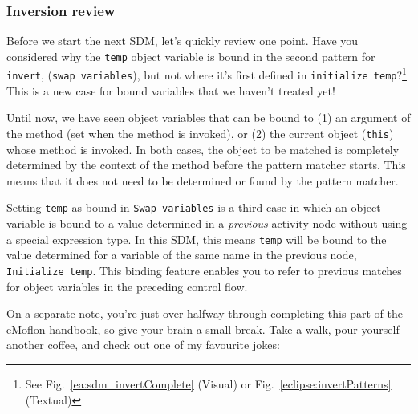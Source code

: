 \newpage
\subsubsection{Inversion review}
\genHeader
\hypertarget{invert close}{}

Before we start the next SDM, let's quickly review one point. Have you considered why the \texttt{temp} object variable is bound in the second pattern for
\texttt{invert}, (\texttt{swap variables}), but not where it's first defined in \texttt{initialize temp}?\footnote{See Fig.~\ref{ea:sdm_invertComplete}
(Visual) or Fig.~\ref{eclipse:invertPatterns} (Textual)} This is a new case for bound variables that we haven't treated yet!

Until now, we have seen object variables that can be bound to (1) an argument of the method (set when the method is invoked), or (2) the
current object (\texttt{this}) whose method is invoked. In both cases, the object to be matched is completely determined by the context of the method before
the pattern matcher starts. This means that it does not need to be determined or found by the pattern matcher.

Setting \texttt{temp} as bound in \texttt{Swap variables} is a third case in which an object variable is bound to a value determined in a \emph{previous}
activity node without using a special expression type. In this SDM, this means \texttt{temp} will be bound to the value determined for a variable
of the same name in the previous node, \texttt{Initialize temp}. This binding feature enables you to refer to previous matches for object variables in the
preceding control flow.

On a separate note, you're just over halfway through completing this part of the eMoflon handbook, so give your brain a small break. Take a walk, pour
yourself another coffee, and check out one of my favourite jokes:

\vspace{0.5cm}


